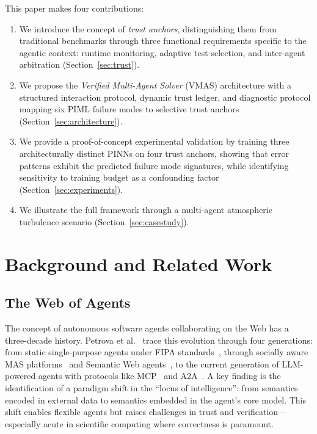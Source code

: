 \documentclass[conference]{IEEEtran}
\begin{document}
This paper makes four contributions:
\begin{enumerate}
    \item We introduce the concept of \emph{trust anchors}, distinguishing them from traditional benchmarks through three functional requirements specific to the agentic context: runtime monitoring, adaptive test selection, and inter-agent arbitration (Section~\ref{sec:trust}).
    \item We propose the \emph{Verified Multi-Agent Solver} (VMAS) architecture with a structured interaction protocol, dynamic trust ledger, and diagnostic protocol mapping six PIML failure modes to selective trust anchors (Section~\ref{sec:architecture}).
    \item We provide a proof-of-concept experimental validation by training three architecturally distinct PINNs on four trust anchors, showing that error patterns exhibit the predicted failure mode signatures, while identifying sensitivity to training budget as a confounding factor (Section~\ref{sec:experiments}).
    \item We illustrate the full framework through a multi-agent atmospheric turbulence scenario (Section~\ref{sec:casestudy}).
\end{enumerate}


\section{Background and Related Work}
\label{sec:background}

\subsection{The Web of Agents}

The concept of autonomous software agents collaborating on the Web has a three-decade history. Petrova et al.~\cite{PetrovaWoA2025} trace this evolution through four generations: from static single-purpose agents under FIPA standards~\cite{FIPA2002}, through socially aware MAS platforms~\cite{JADE2007} and Semantic Web agents~\cite{BernersLee2001}, to the current generation of LLM-powered agents with protocols like MCP~\cite{MCP2024} and A2A~\cite{A2A2025}. A key finding is the identification of a paradigm shift in the ``locus of intelligence'': from semantics encoded in external data to semantics embedded in the agent's core model. This shift enables flexible agents but raises challenges in trust and verification---especially acute in scientific computing where correctness is paramount.
\end{document}
